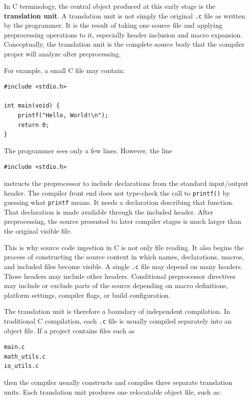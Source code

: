 In C terminology, the central object produced at this early stage is the \textbf{translation unit}. A translation unit is not simply the original \texttt{.c} file as written by the programmer. It is the result of taking one source file and applying preprocessing operations to it, especially header inclusion and macro expansion. Conceptually, the translation unit is the complete source body that the compiler proper will analyze after preprocessing.

For example, a small C file may contain:

\begin{verbatim}
#include <stdio.h>

int main(void) {
    printf("Hello, World!\n");
    return 0;
}
\end{verbatim}

The programmer sees only a few lines. However, the line

\begin{verbatim}
#include <stdio.h>
\end{verbatim}

instructs the preprocessor to include declarations from the standard input/output header. The compiler front end does not type-check the call to \texttt{printf()} by guessing what \texttt{printf} means. It needs a declaration describing that function. That declaration is made available through the included header. After preprocessing, the source presented to later compiler stages is much larger than the original visible file.

This is why source code ingestion in C is not only file reading. It also begins the process of constructing the source context in which names, declarations, macros, and included files become visible. A single \texttt{.c} file may depend on many headers. Those headers may include other headers. Conditional preprocessor directives may include or exclude parts of the source depending on macro definitions, platform settings, compiler flags, or build configuration.

The translation unit is therefore a boundary of independent compilation. In traditional C compilation, each \texttt{.c} file is usually compiled separately into an object file. If a project contains files such as

\begin{verbatim}
main.c
math_utils.c
io_utils.c
\end{verbatim}

then the compiler usually constructs and compiles three separate translation units. Each translation unit produces one relocatable object file, such as:

